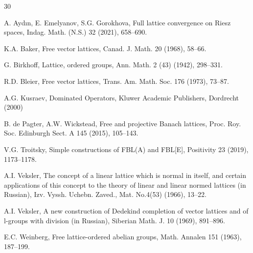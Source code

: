 \documentclass[12pt]{article}
\begin{document}
\begin{thebibliography}{30}
{\tiny 
{}%
A. Ayd{\i}n, E. Emelyanov, S.G. Gorokhova, 
Full lattice convergence on Riesz spaces, 
Indag. Math. (N.S.) 32 (2021), 658--690.

K.A. Baker, 
Free vector lattices,
Canad. J. Math. 20 (1968), 58--66.

G. Birkhoff,  
Lattice, ordered groups,
Ann. Math. 2 (43) (1942), 298--331.

R.D. Bleier,  
Free vector lattices, 
Trans. Am. Math. Soc. 176 (1973), 73--87. 

A.G. Kusraev,
Dominated Operators,
Kluwer Academic Publishers, Dordrecht (2000)

B. de Pagter, A.W. Wickstead,
Free and projective Banach lattices, 
Proc. Roy. Soc. Edinburgh Sect. A 145 (2015), 105--143. 

V.G. Troitsky, 
Simple constructions of FBL(A) and FBL[E], 
Positivity 23 (2019), 1173--1178.

A.I. Veksler,
The concept of a linear lattice which is normal in itself, and certain applications 
of this concept to the theory of linear and linear normed lattices (in Russian),
Izv. Vyssh. Uchebn. Zaved., Mat. No.4(53) (1966), 13--22.

A.I. Veksler,
A new construction of Dedekind completion 
of vector lattices and of l-groups with division (in Russian), 
Siberian Math. J. 10 (1969), 891--896. 

E.C. Weinberg, 
Free lattice-ordered abelian groups,
Math. Annalen 151 (1963), 187--199.}
\end{thebibliography}
\end{document}
